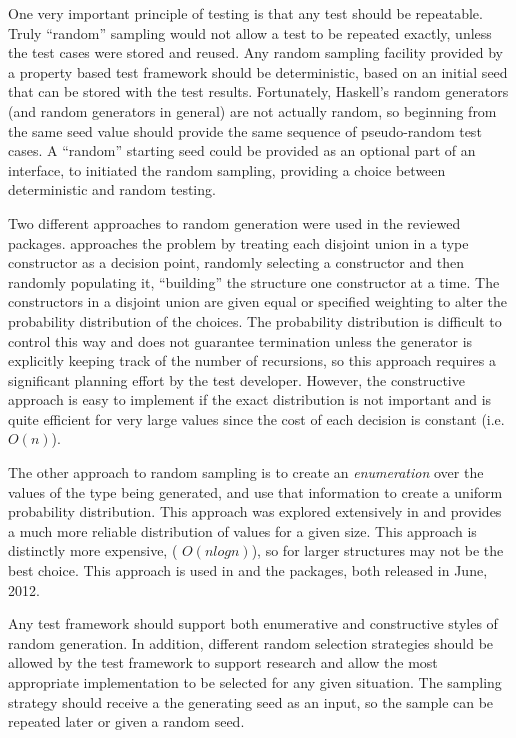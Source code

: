 One very important principle of testing is that any test should be repeatable.
Truly ``random'' sampling would not allow a test to be repeated exactly,
unless the test cases were stored and reused.
Any random sampling facility provided by a property based test framework
should be deterministic, based on an initial seed that can be stored with the test results.
Fortunately, Haskell's random generators (and random generators in general) are not actually random,
so beginning from the same seed value should provide the same sequence of pseudo-random test cases.
A ``random'' starting seed could be provided as an optional part of an interface,
to initiated the random sampling,
providing a choice between deterministic and random testing.

Two different approaches to random generation were used in the reviewed packages.
\QC approaches the problem by treating 
each disjoint union in a type constructor as a decision point,
randomly selecting a constructor and then randomly populating it,
``building'' the structure one constructor at a time.
The constructors in a disjoint union are given equal or specified weighting
to alter the probability distribution of the choices.
The probability distribution is difficult to control this way
and does not guarantee termination unless
the generator is explicitly keeping track of the number of recursions,
so this approach requires a significant planning effort by the test developer.
However, the constructive approach is easy to implement if the exact distribution is not important and
is quite efficient for very large values since the cost of each decision is constant (i.e. $O(n)$).

The other approach to random sampling is to create an \emph{enumeration}
over the values of the type being generated,
and use that information to create a uniform probability distribution.
This approach was explored extensively in \cite{FlajoletZC94,FlSa95}
and provides a much more reliable distribution of values for a given size.
This approach is distinctly more expensive, ( $O (n log n)$),
so for larger structures may not be the best choice.
This approach is used in \FEAT and the \GC packages,
both released in June, 2012.


Any test framework should support both enumerative and constructive styles of random generation.
In addition, different random selection strategies should be allowed by 
the test framework to support research and
allow the most appropriate implementation to be selected for any given situation.
The sampling strategy should receive a the generating seed as an input,
so the sample can be repeated later or given a random seed.


